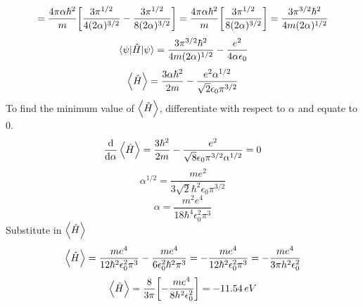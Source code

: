 \documentclass[12pt]{article}
\begin{document}
\[=\frac{4\pi\alpha\hbar^2}{m}\qty[\frac{3\pi^{1/2}}{4(2\alpha)^{3/2}}-\frac{3\pi^{1/2}}{8(2\alpha)^{3/2}}]=\frac{4\pi\alpha\hbar^2}{m}\qty[\frac{3\pi^{1/2}}{8(2\alpha)^{3/2}}]=\frac{3\pi^{3/2}\hbar^2}{4m(2\alpha)^{1/2}}\]
\[\mel{\psi}{\hat{H}}{\psi}=\frac{3\pi^{3/2}\hbar^2}{4m(2\alpha)^{1/2}}-\frac{e^2}{4\alpha\epsilon_0}\]
\[\ev{\hat{H}}=\frac{3\alpha\hbar^2}{2m}-\frac{e^2\alpha^{1/2}}{\sqrt{2}\epsilon_0\pi^{3/2}}\]
To find the minimum value of $\ev{\hat{H}}$, differentiate with respect to $\alpha$ and equate to $0$.
\[\dv{\alpha}\ev{\hat{H}}=\frac{3\hbar^2}{2m}-\frac{e^2}{\sqrt{8}\epsilon_0\pi^{3/2}\alpha^{1/2}}=0\]
\[\alpha^{1/2}=\frac{me^2}{3\sqrt{2}\hbar^2\epsilon_0\pi^{3/2}}\]
\[\alpha=\frac{m^2e^4}{18\hbar^4\epsilon_0^2\pi^{3}}\]
Substitute in $\ev{\hat{H}}$
\[\ev{\hat{H}}=\frac{me^4}{12\hbar^2\epsilon_0^2\pi^{3}}-\frac{me^4}{6\epsilon_0^2\hbar^2\pi^{3}}=-\frac{me^4}{12\hbar^2\epsilon_0^2\pi^{3}}=-\frac{me^4}{3\pi h^2\epsilon_0^2}\]
\[\ev{\hat{H}}=\frac{8}{3\pi}\qty[-\frac{me^4}{8h^2\epsilon_0^2}]=-11.54\,eV\]
\end{document}
